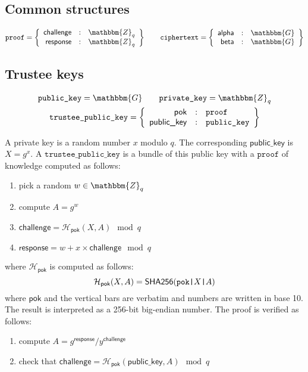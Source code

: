 \documentclass[a4paper]{article}
\newcommand{\G}{\mathbbm{G}}
\newcommand{\Z}{\mathbbm{Z}}
\newcommand{\shatwo}{\textsf{SHA256}}
\newcommand{\tpk}{\texttt{trustee\_public\_key}}
\begin{document}
\subsection{Common structures}
\label{common}

\newcommand{\pk}{\texttt{public\_key}}
\newcommand{\sk}{\texttt{private\_key}}
\newcommand{\proof}{\texttt{proof}}
\newcommand{\iproof}{\texttt{iproof}}
\newcommand{\ciphertext}{\texttt{ciphertext}}

\newcommand{\pklabel}{\textsf{public\_key}}
\newcommand{\pok}{\textsf{pok}}
\newcommand{\challenge}{\textsf{challenge}}
\newcommand{\response}{\textsf{response}}
\newcommand{\alphalabel}{\textsf{alpha}}
\newcommand{\betalabel}{\textsf{beta}}
\newcommand{\Hash}{\mathcal{H}}

\begin{gather*}
  \proof=\left\{
    \begin{array}{rcl}
      \challenge&:&\Z_q\\
      \response&:&\Z_q
    \end{array}
  \right\}
  \qquad
  \ciphertext=\left\{
    \begin{array}{rcl}
      \alphalabel&:&\G\\
      \betalabel&:&\G
    \end{array}
  \right\}
\end{gather*}

\subsection{Trustee keys}
\label{trustee-keys}

\begin{gather*}
  \pk=\G\qquad\sk=\Z_q\\
  \tpk=\left\{
    \begin{array}{rcl}
      \pok&:&\proof\\
      \pklabel&:&\pk
    \end{array}
  \right\}
\end{gather*}

A private key is a random number $x$ modulo $q$. The corresponding
$\pklabel$ is $X=g^x$. A $\tpk$ is a bundle of this public key with a
\hyperref[common]{$\proof$} of knowledge computed as follows:
\begin{enumerate}
\item pick a random $w\in\Z_q$
\item compute $A=g^w$
\item $\challenge=\Hash_\pok(X,A)\mod q$
\item $\response=w+x\times\challenge\mod q$
\end{enumerate}
where $\Hash_\pok$ is computed as follows:
\[\Hash_\pok(X,A) = \shatwo(\verb=pok|=X\verb=|=A) \]
where $\pok$ and the vertical bars are verbatim and numbers are
written in base 10. The result is interpreted as a 256-bit big-endian
number. The proof is verified as follows:
\begin{enumerate}
\item compute $A={g^\response}/{y^\challenge}$
\item check that $\challenge=\Hash_\pok(\pklabel,A)\mod q$
\end{enumerate}
\end{document}
